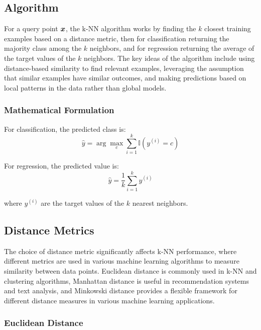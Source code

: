 \subsection{Algorithm}

For a query point $\boldsymbol{x}$, the k-NN algorithm works by finding the $k$ closest training examples based on a distance metric, then for classification returning the majority class among the $k$ neighbors, and for regression returning the average of the target values of the $k$ neighbors. The key ideas of the algorithm include using distance-based similarity to find relevant examples, leveraging the assumption that similar examples have similar outcomes, and making predictions based on local patterns in the data rather than global models.

\subsubsection{Mathematical Formulation}

For classification, the predicted class is:
\begin{equation}
\hat{y} = \arg\max_{c} \sum_{i=1}^{k} \mathbb{I}(y^{(i)} = c)
\end{equation}

For regression, the predicted value is:
\begin{equation}
\hat{y} = \frac{1}{k} \sum_{i=1}^{k} y^{(i)}
\end{equation}

where $y^{(i)}$ are the target values of the $k$ nearest neighbors.

\subsection{Distance Metrics}

The choice of distance metric significantly affects k-NN performance, where different metrics are used in various machine learning algorithms to measure similarity between data points. Euclidean distance is commonly used in k-NN and clustering algorithms, Manhattan distance is useful in recommendation systems and text analysis, and Minkowski distance provides a flexible framework for different distance measures in various machine learning applications.

\subsubsection{Euclidean Distance}

